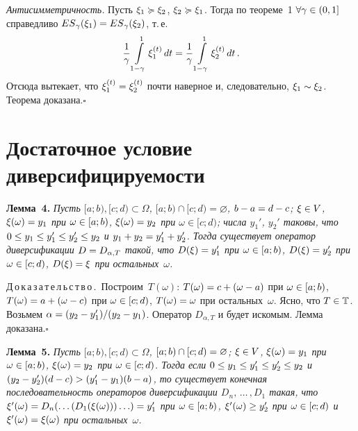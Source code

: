 \begin{multicols}{2}
\textit{Антисимметричность.} Пусть $\xi_1 \succcurlyeq \xi_2$, $\xi_2
\hm\divers \xi_1$. Тогда по теореме~1 $\forall \gamma \hm\in (0,1]$
справедливо ${ES}_\gamma(\xi_1)\hm = {ES}_\gamma(\xi_2)$, т.\,е.\
$$
\displaystyle\frac{\displaystyle 1\mathstrut}{\displaystyle \gamma\mathstrut} \int\limits_{1-\gamma}^1 \xi_1^{(t)} \,dt = \displaystyle\frac{\displaystyle 1\mathstrut}{\displaystyle \gamma\mathstrut}
\int\limits_{1-\gamma}^1 \xi_2^{(t)} \,dt\,.
$$ 
Отсюда вытекает, что
$\xi_1^{(t)} \hm= \xi_2^{(t)}$ почти наверное и, следовательно, $\xi_1
\hm\sim \xi_2$. Теорема доказана.\hfill$\square$


\section{Достаточное условие диверсифицируемости}

\noindent
\textbf{Лемма~4.} \textit{Пусть $[a;b),[c;d) \subset \Omega$,
$[a;b)\cap[c;d)=\varnothing$, $b-a\hm=d\hm-c$; $\xi\hm\in V$,
$\xi(\omega) \hm= y_1$  при $\omega \hm\in [a;b)$, $\xi(\omega)\hm =
y_2$ при $\omega \in [c;d)$; числа $y_1'$, $y_2'$ таковы, что
$0 \hm\le y_1 \hm\le y_1' \hm\le y_2' \hm\le y_2$ и $y_1\hm+y_2 \hm= y_1'\hm+
y_2'$. Тогда существует оператор диверсификации $D \hm= D_{\alpha,T}$
такой, что $D(\xi) \hm= y_1'$ при $\omega \hm\in [a;b)$, $D(\xi) \hm= y_2'$
при $\omega \hm\in [c;d)$,  $D(\xi) \hm= \xi$ при остальных~$\omega $.}

\medskip

\noindent
Д\,о\,к\,а\,з\,а\,т\,е\,л\,ь\,с\,т\,в\,о\,.\ 
Построим~$T(\omega)$:  $T(\omega) \hm= c \hm+ (\omega \hm- a)$ при $\omega
\hm\in [a;b)$, $T(\omega) \hm= a \hm+ (\omega \hm- c)$ при $\omega \hm\in [c;d)$,
$T(\omega) \hm= \omega$ при остальных~$\omega$. Ясно, что $T \hm\in
\classT$. Возьмем $\alpha \hm= (y_2-y_1')/(y_2-y_1)$. Оператор
$D_{\alpha,T}$ и будет искомым. Лемма доказана.\hfill$\square$

\medskip

\noindent
\textbf{Лемма~5.} \textit{Пусть $[a;b),[c;d) \subset \Omega$,
$[a;b)\cap[c;d)\hm=\varnothing$; $\xi\hm\in V$, $\xi(\omega) \hm= y_1$ при
$\omega\hm\in[a;b)$, $\xi(\omega)\hm = y_2$ при $\omega\hm\in[c;d)$. Тогда
если $ 0 \hm\le y_1 \hm\le y_1' \hm\le y_2' \hm\le y_2 $ и 
$(y_2 \hm- y_2')(d-c) \hm > (y_1' \hm- y_1)(b-a)$, 
то существует конечная последовательность
операторов диверсификации $D_n,\,\ldots\,,D_1$ такая, что
$\xi'(\omega) \hm= D_n(\ldots(D_1(\xi(\omega)))\ldots) \hm= y_1'$ при  
$\omega \hm\in [a;b)$, $\xi'(\omega) \hm\ge y_2'$  при 
$\omega \hm\in [c;d)$ и  $\xi'(\omega) \hm= \xi(\omega)$ при
остальных~$\omega$.} 

\medskip


\end{multicols}
